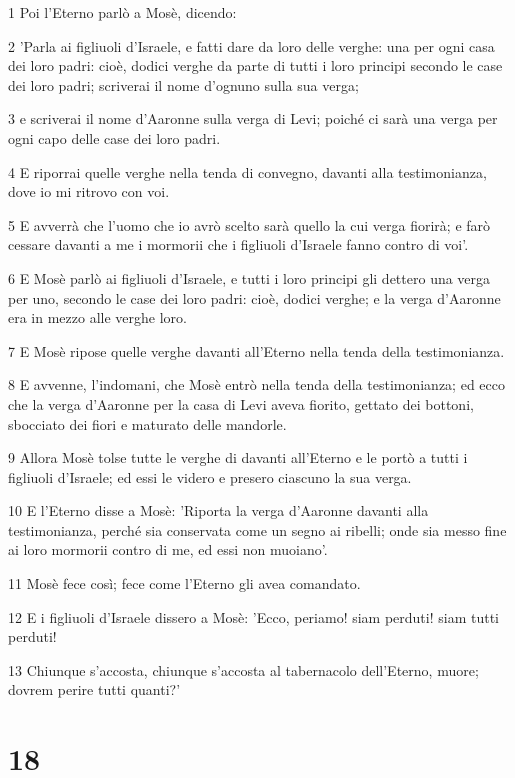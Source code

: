 \par 1 Poi l'Eterno parlò a Mosè, dicendo:
\par 2 'Parla ai figliuoli d'Israele, e fatti dare da loro delle verghe: una per ogni casa dei loro padri: cioè, dodici verghe da parte di tutti i loro principi secondo le case dei loro padri; scriverai il nome d'ognuno sulla sua verga;
\par 3 e scriverai il nome d'Aaronne sulla verga di Levi; poiché ci sarà una verga per ogni capo delle case dei loro padri.
\par 4 E riporrai quelle verghe nella tenda di convegno, davanti alla testimonianza, dove io mi ritrovo con voi.
\par 5 E avverrà che l'uomo che io avrò scelto sarà quello la cui verga fiorirà; e farò cessare davanti a me i mormorii che i figliuoli d'Israele fanno contro di voi'.
\par 6 E Mosè parlò ai figliuoli d'Israele, e tutti i loro principi gli dettero una verga per uno, secondo le case dei loro padri: cioè, dodici verghe; e la verga d'Aaronne era in mezzo alle verghe loro.
\par 7 E Mosè ripose quelle verghe davanti all'Eterno nella tenda della testimonianza.
\par 8 E avvenne, l'indomani, che Mosè entrò nella tenda della testimonianza; ed ecco che la verga d'Aaronne per la casa di Levi aveva fiorito, gettato dei bottoni, sbocciato dei fiori e maturato delle mandorle.
\par 9 Allora Mosè tolse tutte le verghe di davanti all'Eterno e le portò a tutti i figliuoli d'Israele; ed essi le videro e presero ciascuno la sua verga.
\par 10 E l'Eterno disse a Mosè: 'Riporta la verga d'Aaronne davanti alla testimonianza, perché sia conservata come un segno ai ribelli; onde sia messo fine ai loro mormorii contro di me, ed essi non muoiano'.
\par 11 Mosè fece così; fece come l'Eterno gli avea comandato.
\par 12 E i figliuoli d'Israele dissero a Mosè: 'Ecco, periamo! siam perduti! siam tutti perduti!
\par 13 Chiunque s'accosta, chiunque s'accosta al tabernacolo dell'Eterno, muore; dovrem perire tutti quanti?'

\chapter{18}

